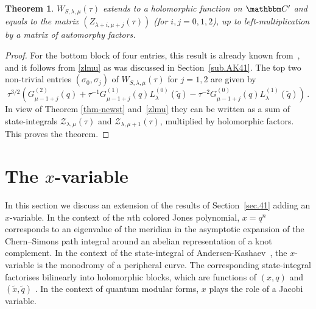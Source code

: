 \documentclass[12pt,reqno]{amsart}
\newtheorem{theorem}{Theorem}
\theoremstyle{definition}
\def\BC{\mathbbm C}
\def\s{\sigma}
\def\tq{\tilde{q}}
\def\tx{\tilde{x}}
\def\tx{\tilde{x}}
\def\mc{\mathcal}
\begin{document}
\begin{theorem}
  \label{thm.2}
  $W_{S,\lambda,\mu}(\tau)$ extends to a holomorphic function on
  $\BC'$ and equals to the matrix $(Z_{\lambda+i,\mu+j}(\tau))$
(for $i,j =0,1,2$), up to left-multiplication by a matrix of automorphy factors.
\end{theorem}

\begin{proof}
  For the bottom block of four entries, this result is already known
  from~\cite{GGM:resurgent,GGM:peacock}, and it follows from \eqref{zlmu} as
  was discussed in Section~\ref{sub.AK41}. The top
  two non-trivial entries $(\s_0,\s_j)$ of $W_{S,\lambda,\mu}(\tau)$ for $j=1,2$
  are given by  
%
\begin{equation}
  \tau^{3/2}\left(G_{\mu-1+j}^{(2)}(q)
    +\tau^{-1} G_{\mu-1+j}^{(1)}(q)L_{\lambda}^{(0)}(\tq) - 
    \tau^{-2} G_{\mu-1+j}^{(0)}(q)L_{\lambda}^{(1)}(\tq) \right)\,.
\end{equation}
%
In view of Theorem \ref{thm-newst} and~\eqref{zlmu} they can be written as a sum of
state-integrals ${\mc{Z}}_{\lambda, \mu}(\tau)$ and ${\mc{Z}}_{\lambda, \mu+1}(\tau)$,
multiplied by holomorphic factors. This proves the theorem.
\end{proof} 


\section{The $x$-variable}
\label{sub.xvariable}

In this section we discuss an extension of the results of Section~\ref{sec.41}
adding an $x$-variable. In the context of the $n$th colored Jones polynomial,
$x=q^n$ corresponds to an eigenvalue of the meridian in the asymptotic expansion of
the Chern--Simons path integral around an abelian representation of a knot complement.
In the context of the state-integral of Andersen-Kashaev~\cite{AK}, the $x$-variable
is the monodromy of a peripheral curve. The corresponding state-integral factorises
bilinearly into holomorphic blocks, which are functions of $(x,q)$ and $(\tx,\tq)$ \cite{Beem}.
In the context of quantum modular forms, $x$ plays the role of a Jacobi variable.
\end{document}
